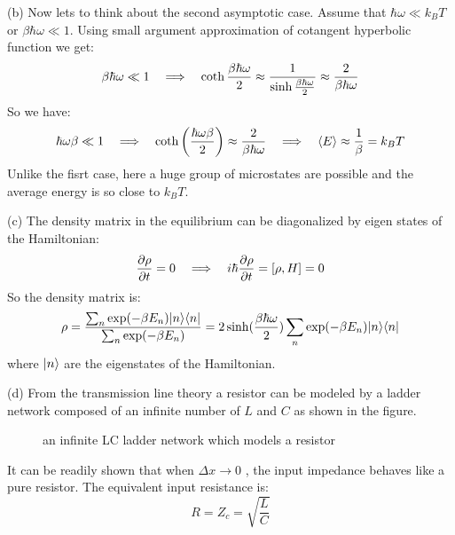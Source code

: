 \begin{homeworkProblem}
\begin{homeworkSection}{(b)}
Now lets to think about the second asymptotic case. Assume that $\hbar\omega\ll k_BT$ or $\beta\hbar\omega\ll 1$. Using small argument approximation of cotangent hyperbolic function we get:
\begin{equation}
\beta\hbar\omega\ll 1\quad\Longrightarrow\quad\coth\frac{\beta\hbar\omega}{2}\approx\frac{1}{\sinh\frac{\beta\hbar\omega}{2}}\approx \frac{2}{\beta\hbar\omega}
\end{equation}  
So we have:
\begin{equation}\label{P2-Im}
\hbar\omega\beta\ll 1\quad\Longrightarrow\quad \coth\left(\frac{\hbar\omega\beta}{2}\right)\approx \frac{2}{\beta\hbar\omega}\quad\Longrightarrow\quad \langle E\rangle \approx \frac{1}{\beta}=k_BT
\end{equation}
Unlike the fisrt case, here a huge group of microstates are possible and the average energy is so close to $k_BT$.
\end{homeworkSection}
\begin{homeworkSection}{(c)}
The density matrix in the equilibrium can be diagonalized by eigen states of the Hamiltonian:
\begin{equation}
\dfrac{\partial \rho}{\partial t}=0\quad\Longrightarrow\quad i\hbar\dfrac{\partial \rho}{\partial t}=[\rho ,H]=0
\end{equation}
So the density matrix is:
\begin{equation}
\rho=\frac{\sum_n\exp(-\beta E_n)|n\rangle\langle n|}{\sum_n \exp(-\beta E_n)}=2\sinh(\frac{\beta\hbar\omega}{2})\sum_n\exp(-\beta E_n)|n\rangle\langle n|
\end{equation}
where $|n\rangle$ are the eigenstates of the Hamiltonian.
\end{homeworkSection}
\begin{homeworkSection}{(d)}
From the transmission line theory a resistor can be modeled by a ladder network composed of  an infinite number of  $L$ and $C$ as shown in the figure.
\begin{figure}[!h] 
\centering

\caption{\small an infinite LC ladder network which models a resistor}
\end{figure}


It can be readily shown that when $\Delta x\to 0$ , the input impedance behaves like a pure resistor. The equivalent input resistance is:
\begin{equation}
R=Z_c=\sqrt{\frac{L}{C}}
\end{equation}


\end{homeworkSection}
\end{homeworkProblem}
